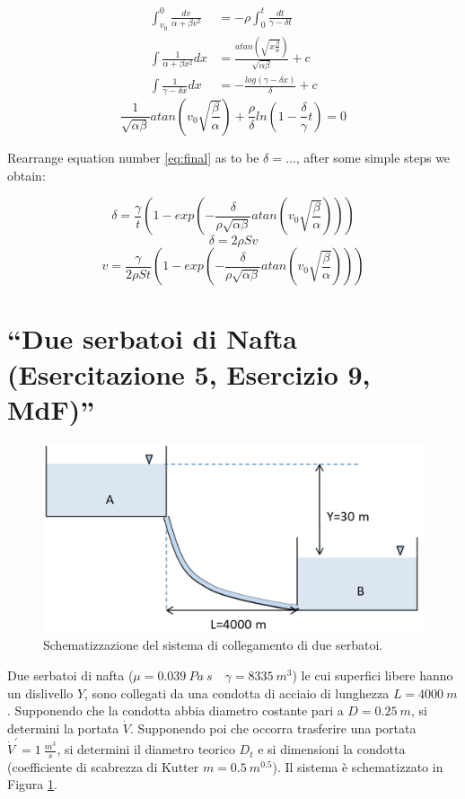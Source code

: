 \documentclass[oneside]{article}
\begin{document}
\begin{align}
   \int_{v_{0}}^{0} \frac{dv}{\alpha + \beta v^{2}} &= -\rho \int_{0}^{t}
   \frac{dt}{\gamma - \delta t} \\
   \int \frac{1}{\alpha + \beta x^{2}} dx &=
   \frac{atan\left(\sqrt{x\frac{\beta}{\alpha}}\right)}{\sqrt{\alpha \beta}} + c \\
   \int \frac{1}{\gamma - \delta x} dx &= -\frac{log\left(\gamma - \delta
   x\right)}{\delta} + c
\end{align}
\begin{equation}
   \label{eq:final}
   \frac{1}{\sqrt{\alpha\beta}} atan\left( v_{0} \sqrt{\frac{\beta}{\alpha}}\right) +
   \frac{\rho}{\delta}ln\left(1-\frac{\delta}{\gamma}t\right) = 0
\end{equation}

Rearrange equation number \ref{eq:final} as to be $\delta = ...$, after some simple steps
we obtain:

\begin{equation}
   \delta = \frac{\gamma}{t}\left(1-exp\left(-\frac{\delta}{\rho \sqrt{\alpha \beta}}
   atan\left(v_{0}\sqrt{\frac{\beta}{\alpha}}\right)\right)\right)
\end{equation}
\begin{equation*}
   \delta = 2 \rho S v
\end{equation*}
\begin{equation}
   v = \frac{\gamma}{2 \rho S t}\left(1-exp\left(-\frac{\delta}{\rho \sqrt{\alpha \beta}}
      atan\left(v_{0}\sqrt{\frac{\beta}{\alpha}}\right)\right)\right)
\end{equation}

\section{``Due serbatoi di Nafta (Esercitazione 5, Esercizio 9, MdF)''}
\begin{figure}[htp]
    \centering
    \includegraphics[width=.8\textwidth]{Serbatoi.png}
    \caption{Schematizzazione del sistema di collegamento di due serbatoi.}
    \label{fig:figura_2}
\end{figure}
Due serbatoi di nafta ($\mu = 0.039\:Pa\:s \quad \gamma = 8335 \:m^{3}$) le cui superfici
libere hanno un dislivello $Y$, sono collegati da una condotta di acciaio di lunghezza
$L = 4000 \: m$. Supponendo che la condotta abbia diametro costante pari a $D = 0.25 \: m$, si
determini la portata $\dot{V}$. Supponendo poi che occorra trasferire una portata
$\dot{V}^{'} = 1 \: \frac{m^{3}}{s}$, si determini il diametro teorico $D_{t}$ e si
dimensioni la condotta (coefficiente di scabrezza di Kutter $m = 0.5 \: m^{0.5}$). Il
sistema è schematizzato in Figura \ref{fig:figura_2}.
\end{document}
